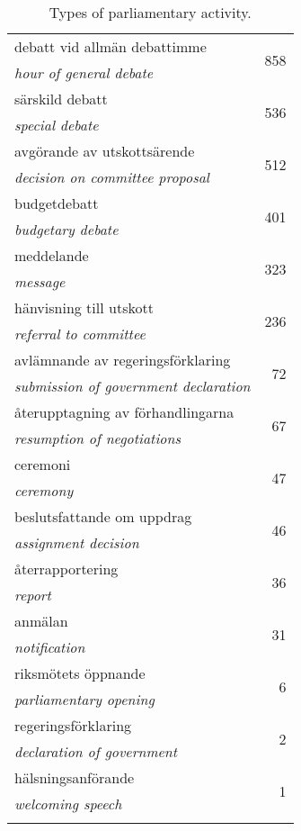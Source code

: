 \begin{center}
\begin{longtable}{|l|r|}
debatt vid allmän debattimme & \multirow{2}{*}{858} \\ \emph{hour of general debate} & \multicolumn{1}{c|}{} \\ \hline
särskild debatt & \multirow{2}{*}{536} \\ \emph{special debate} & \multicolumn{1}{c|}{} \\ \hline
avgörande av utskottsärende & \multirow{2}{*}{512} \\ \emph{decision on committee proposal} & \multicolumn{1}{c|}{} \\ \hline
budgetdebatt & \multirow{2}{*}{401} \\ \emph{budgetary debate} & \multicolumn{1}{c|}{} \\ \hline
meddelande & \multirow{2}{*}{323} \\ \emph{message} & \multicolumn{1}{c|}{} \\ \hline
hänvisning till utskott & \multirow{2}{*}{236} \\ \emph{referral to committee} & \multicolumn{1}{c|}{} \\ \hline
avlämnande av regeringsförklaring & \multirow{2}{*}{72} \\ \emph{submission of government declaration} & \multicolumn{1}{c|}{} \\ \hline
återupptagning av förhandlingarna & \multirow{2}{*}{67} \\ \emph{resumption of negotiations} & \multicolumn{1}{c|}{} \\ \hline
ceremoni & \multirow{2}{*}{47} \\ \emph{ceremony} & \multicolumn{1}{c|}{} \\ \hline
beslutsfattande om uppdrag & \multirow{2}{*}{46} \\ \emph{assignment decision} & \multicolumn{1}{c|}{} \\ \hline
återrapportering & \multirow{2}{*}{36} \\ \emph{report} & \multicolumn{1}{c|}{} \\ \hline
anmälan & \multirow{2}{*}{31} \\ \emph{notification} & \multicolumn{1}{c|}{} \\ \hline
riksmötets öppnande & \multirow{2}{*}{6} \\ \emph{parliamentary opening} & \multicolumn{1}{c|}{} \\ \hline
regeringsförklaring & \multirow{2}{*}{2} \\ \emph{declaration of government} & \multicolumn{1}{c|}{} \\ \hline
hälsningsanförande & \multirow{2}{*}{1} \\ \emph{welcoming speech} & \multicolumn{1}{c|}{} \\
\hline
\caption{\label{kam-table} Types of parliamentary activity.  }
\bigskip
\end{longtable}
\end{center}

